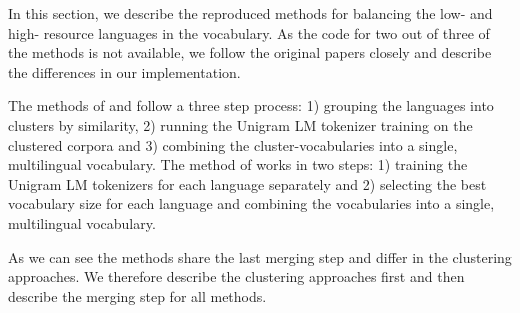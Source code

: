 



In this section, we describe the reproduced methods for balancing the low- and high- resource languages in the vocabulary. As the code for two out of three of the methods is not available, we follow the original papers closely and describe the differences in our implementation.

The methods of \citet{chung_improving_2020} and \citet{liang_xlm-v_2023} follow a three step process: 1) grouping the languages into clusters by similarity, 2) running the Unigram LM tokenizer training on the clustered corpora and 3) combining the cluster-vocabularies into a single, multilingual vocabulary. The method of \citet{zheng_allocating_2021} works in two steps: 1) training the Unigram LM tokenizers for each language separately and 2) selecting the best vocabulary size for each language and combining the vocabularies into a single, multilingual vocabulary.

As we can see the methods share the last merging step and differ in the clustering approaches. We therefore describe the clustering approaches first and then describe the merging step for all methods.

